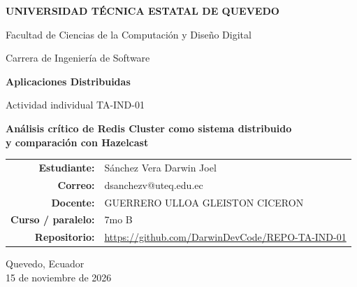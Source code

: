 \documentclass[11pt,a4paper]{article}
\begin{document}
\begin{titlepage}
  \centering
  {\Large\bfseries UNIVERSIDAD TÉCNICA ESTATAL DE QUEVEDO\par}
  \vspace{0.3cm}
  {\large Facultad de Ciencias de la Computación y Diseño Digital\par}
  {\large Carrera de Ingeniería de Software\par}
  \vspace{2cm}
  {\large\bfseries Aplicaciones Distribuidas\par}
  \vspace{0.3cm}
  {\large Actividad individual TA-IND-01\par}
  \vspace{1.5cm}
  {\LARGE\bfseries Análisis crítico de Redis Cluster como sistema distribuido\\[0.2cm]
   y comparación con Hazelcast\par}
  \vspace{2cm}
  \begin{tabular}{rl}
    \textbf{Estudiante:} & Sánchez Vera Darwin Joel \\
    \textbf{Correo:}     & dsanchezv@uteq.edu.ec \\
    \textbf{Docente:}    & GUERRERO ULLOA GLEISTON CICERON \\
    \textbf{Curso / paralelo:} & 7mo B \\
    \textbf{Repositorio:} & \url{https://github.com/DarwinDevCode/REPO-TA-IND-01} \\
  \end{tabular}
  \vfill
  {\large Quevedo, Ecuador\\ 15 de noviembre de 2026\par}
\end{titlepage}
\end{document}
